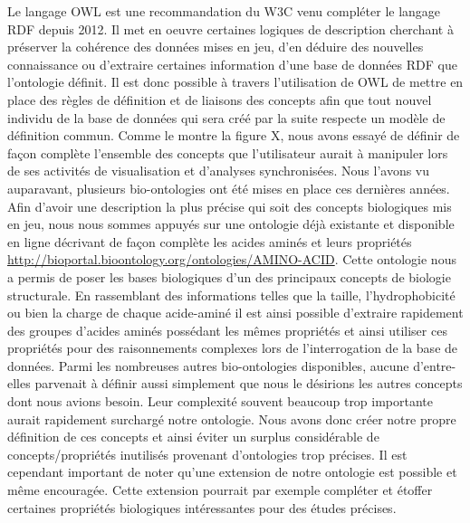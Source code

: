 Le langage OWL est une recommandation du W3C venu compléter le langage RDF depuis 2012. Il met en oeuvre certaines logiques de description cherchant à préserver la cohérence des données mises en jeu, d'en déduire des nouvelles connaissance ou d'extraire certaines information d'une base de données RDF que l'ontologie définit. Il est donc possible à travers l'utilisation de OWL de mettre en place des règles de définition et de liaisons des concepts afin que tout nouvel individu de la base de données qui sera créé par la suite respecte un modèle de définition commun. 
Comme le montre la figure X, nous avons essayé de définir de façon complète l'ensemble des concepts que l'utilisateur aurait à manipuler lors de ses activités de visualisation et d'analyses synchronisées. 
Nous l'avons vu auparavant, plusieurs bio-ontologies ont été mises en place ces dernières années. Afin d'avoir une description la plus précise qui soit des concepts biologiques mis en jeu, nous nous sommes appuyés sur une ontologie déjà existante et disponible en ligne décrivant de façon complète les acides aminés et leurs propriétés \url{http://bioportal.bioontology.org/ontologies/AMINO-ACID}. Cette ontologie nous a permis de poser les bases biologiques d'un des principaux concepts de biologie structurale. En rassemblant des informations telles que la taille, l'hydrophobicité ou bien la charge de chaque acide-aminé il est ainsi possible d'extraire rapidement des groupes d'acides aminés possédant les mêmes propriétés et ainsi utiliser ces propriétés pour des raisonnements complexes lors de l'interrogation de la base de données. Parmi les nombreuses autres bio-ontologies disponibles, aucune d'entre-elles parvenait à définir aussi simplement que nous le désirions les autres concepts dont nous avions besoin. Leur complexité souvent beaucoup trop importante aurait rapidement surchargé notre ontologie. Nous avons donc créer notre propre définition de ces concepts et ainsi éviter un surplus considérable de concepts/propriétés inutilisés provenant d'ontologies trop précises. Il est cependant important de noter qu'une extension de notre ontologie est possible et même encouragée. Cette extension pourrait par exemple compléter et étoffer certaines propriétés biologiques intéressantes pour des études précises.
